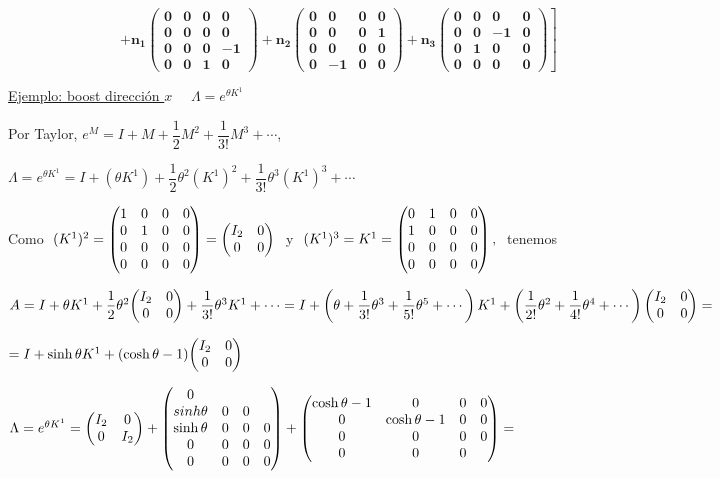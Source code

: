 $\boldsymbol{ \qquad \qquad \qquad \qquad  \left.  +n_{ 1 }\begin{pmatrix} 0 & 0 & 0 & 0 \\ 0 & 0 & 0 & 0 \\ 0 & 0 & 0 & -1 \\ 0 & 0 & 1 & 0 \end{pmatrix}+n_{ 2 }\begin{pmatrix} 0 & 0 & 0 & 0 \\ 0 & 0 & 0 & 1 \\ 0 & 0 & 0 & 0 \\ 0 & -1 & 0 & 0 \end{pmatrix}+n_{ 3 }\begin{pmatrix} 0 & 0 & 0 & 0 \\ 0 & 0 & -1 & 0 \\ 0 & 1 & 0 & 0 \\ 0 & 0 & 0 & 0 \end{pmatrix} \right] }$


\vspace{5mm}

\underline{Ejemplo: boost dirección $x$} $\quad \Lambda=e^{\theta K^1}$

Por Taylor, $e^M=I+M+\dfrac 1 2 M^2 + \dfrac 1 {3!} M^3 + \cdots$,

$\Lambda=e^{\theta K^1}=I+(\theta K^1) + \dfrac 1 2 \theta^2 (K^1)^2 + \dfrac 1{3!} \theta^3 (K^1)^3 + \cdots $

Como $\ (K^1)^2= \mqty(1&0&0&0\\0&1&0&0 \\0&0&0&0\\0&0&0&0)=\mqty(I_2&0\\0&0) \ $ y $\ (K^1)^3=K^1=\mqty(0&1&0&0\\1&0&0&0\\0&0&0&0\\0&0&0&0)\, , \ $ tenemos 

$A=I+\theta K^1+\dfrac 1 2 \theta^2 \mqty(I_2&0\\0&0)+ \dfrac 1{3!} \theta^3 K^1 + \cdots = I+\left( \theta + \dfrac 1{3!} \theta^3 + \dfrac 1 {5!} \theta^5 + \cdots \right)  K^1 + \left( \dfrac 1{2!} \theta^2 + \dfrac 1{4!} \theta^4 + \cdots \right) \mqty(I_2&0\\0&0) =$

$=I+\sinh \theta K^1 + (\cosh \theta - 1 ) \mqty(I_2&0\\0&0)$

$\Lambda=e^{\theta K^1}= \mqty(I_2&0\\0&I_2) + \mqty(0 & \\sinh \theta &0&0\\ \sinh \theta &0&0&0 \\ 0&0&0&0 \\ 0&0&0&0 ) + \mqty(\cosh \theta -1 &0&0&0 \\ 0&\cosh \theta - 1 &0&0 \\ 0&0&0&0 \\ 0&0&0&) =$

